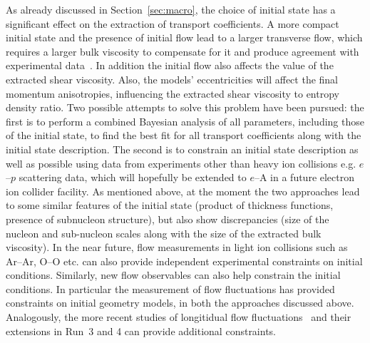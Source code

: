 As already discussed in Section~\ref{sec:macro}, the choice of initial state has 
  a significant effect on the extraction of transport coefficients. 
A more compact initial state and the presence of initial flow lead to a larger 
  transverse flow, which requires a larger bulk viscosity to compensate for it 
  and produce agreement with experimental data~\cite{Schenke:2018fci}. 
%
In addition the initial flow also affects the value of the extracted 
  shear viscosity.
%
Also, the models' eccentricities will affect the final momentum anisotropies, 
  influencing the extracted shear viscosity to entropy density ratio. 
Two possible attempts to solve this problem have been pursued: 
  the first is to perform a combined Bayesian analysis of all parameters, 
  including those of the initial state, to find the best fit for all transport 
  coefficients along with the initial state description.
The second is to constrain an initial state description as well as possible 
  using data from experiments other than heavy ion collisions e.g. $e$--$p$ 
  scattering data, which will hopefully be extended to $e$--A in a future 
  electron ion collider facility.
As mentioned above, at the moment the two approaches lead to some similar 
  features of the initial state (product of thickness functions, presence 
  of subnucleon structure), but also show discrepancies (size of the nucleon 
  and sub-nucleon scales along with the size of the extracted bulk viscosity). 
In the near future, flow measurements in light ion collisions such as 
  Ar--Ar, O--O etc. can also provide independent experimental constraints 
  on initial conditions. 
Similarly, new flow observables can also help constrain the initial conditions.
In particular the measurement of flow fluctuations has provided constraints
  on initial geometry models, in both the approaches discussed above.
Analogously, the more recent studies of longitidual flow 
  fluctuations~\cite{CMS-HIN-14-012, CMS-HIN-15-008, HION-2016-04}
  and their extensions in Run~3 and 4 can provide additional constraints. 










